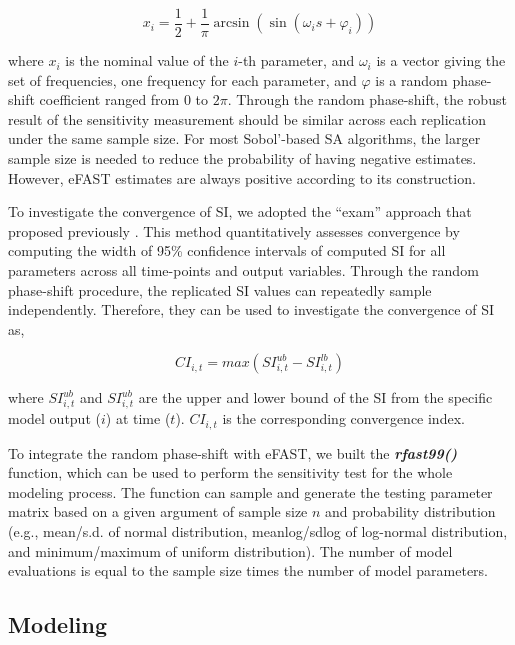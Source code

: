 \documentclass[preprint,12pt, a4paper]{elsarticle}
\begin{document}
\[ x_i = \frac{1}{2} + \frac{1}{\pi}\arcsin(\sin(\omega_is + \varphi_i)) \]

where \(x_i\) is the nominal value of the \(i\)-th parameter, and \(\omega_i\) is a vector giving the set of frequencies, one frequency for each parameter, and \(\varphi\) is a random phase-shift coefficient
ranged from 0 to \(2\pi\). Through the random phase-shift, the robust result of the sensitivity measurement should be similar across each replication under the same sample size. For most Sobol'-based SA algorithms, the larger sample size is needed to reduce the probability of having negative estimates. However, eFAST estimates are always positive according to its construction.

To investigate the convergence of SI, we adopted the ``exam'' approach that proposed previously \cite{sarrazin2016global}. This method quantitatively assesses convergence by computing the width of 95\% confidence intervals of computed SI for all parameters across all time-points and output variables. Through the random phase-shift procedure, the replicated SI values can repeatedly sample independently. Therefore, they can be used to investigate the convergence of SI as,

\[CI_{i,t} = max(SI_{i,t}^{ub}-SI_{i,t}^{lb})\]

where \(SI_{i,t}^{ub}\) and \(SI_{i,t}^{ub}\) are the upper and lower bound of the SI from the specific model output (\(i\)) at time (\(t\)). \(CI_{i,t}\) is the corresponding convergence index.

To integrate the random phase-shift with eFAST, we built the \textbf{\textit{rfast99()}} function, which can be used to perform the sensitivity test for the whole modeling process. The function can sample and generate the testing parameter matrix based on a given argument of sample size \(n\) and probability distribution (e.g., mean/s.d. of normal distribution, meanlog/sdlog of log-normal distribution, and minimum/maximum of uniform distribution). The number of model evaluations is equal to the sample size times the number of model parameters.


\subsection{Modeling}
\end{document}
